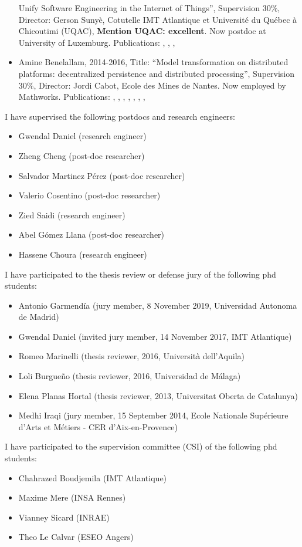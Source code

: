 \begin{itemize}
  Unify Software Engineering in the Internet of Things'', Supervision
  30\%, Director: Gerson Sunyè, Cotutelle IMT Atlantique et Université
  du Québec à Chicoutimi (UQAC), \textbf{Mention UQAC: excellent}. Now postdoc at University of Luxemburg. Publications: \cite{berrouyneModelBasedCommunicationControl2018}, \cite{berrouyneCyprIoTFrameworkModelling2019}, \cite{berrouyneModelDrivenApproachUnravel2020}, \cite{berrouyneModelDrivenMethodologyAccelerate2022}
\item
  Amine Benelallam, 2014-2016, Title: ``Model transformation on
  distributed platforms: decentralized persistence and distributed
  processing'', Supervision 30\%, Director: Jordi Cabot, Ecole des Mines
  de Nantes. Now employed by Mathworks. Publications: \cite{Benelallam2014}, \cite{Daniel2014}, \cite{Benelallam2015}, \cite{Benelallam2015a}, \cite{Gomez2015}, \cite{benelallamEfficientModelPartitioning2016}, \cite{danielNeoEMFMultidatabaseModel2017}, \cite{benelallamDistributingRelationalModel2018} 
\end{itemize}

I have supervised the following postdocs and research engineers:

\begin{itemize}
\tightlist
\item
  Gwendal Daniel (research engineer)
\item
  Zheng Cheng (post-doc researcher)
\item
  Salvador Martinez Pérez (post-doc researcher)
\item
  Valerio Cosentino (post-doc researcher)
\item
  Zied Saidi (research engineer)
\item
  Abel Gómez Llana (post-doc researcher)
\item
  Hassene Choura (research engineer)
\end{itemize}

I have participated to the thesis review or defense jury of the
following phd students:

\begin{itemize}
\tightlist
\item
  Antonio Garmendía (jury member, 8 November 2019, Universidad Autonoma
  de Madrid)
\item
  Gwendal Daniel (invited jury member, 14 November 2017, IMT Atlantique)
\item
  Romeo Marinelli (thesis reviewer, 2016, Università dell'Aquila)
\item
  Loli Burgueño (thesis reviewer, 2016, Universidad de Málaga)
\item
  Elena Planas Hortal (thesis reviewer, 2013, Universitat Oberta de
  Catalunya)
\item
  Medhi Iraqi (jury member, 15 September 2014, Ecole Nationale
  Supérieure d'Arts et Métiers - CER d'Aix-en-Provence)
\end{itemize}

I have participated to the supervision committee (CSI) of the following
phd students:

\begin{itemize}
\tightlist
\item
  Chahrazed Boudjemila (IMT Atlantique)
\item
  Maxime Mere (INSA Rennes)
\item
  Vianney Sicard (INRAE)
\item
  Theo Le Calvar (ESEO Angers)
\end{itemize}

